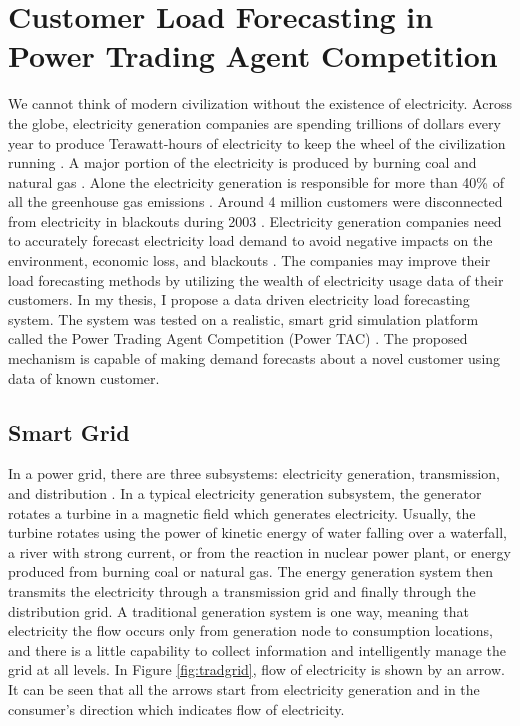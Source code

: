 
\chapter{Customer Load Forecasting in Power Trading Agent Competition}

We cannot think of modern civilization without the existence of electricity. Across the globe, electricity generation companies are spending trillions of dollars every year to produce Terawatt-hours of electricity to keep the wheel of the civilization running \cite{electricityStats}. A major portion of the electricity is produced by burning coal and natural gas \cite{electricityStats}. Alone the electricity generation is responsible for more than 40\% of all the greenhouse gas emissions \cite{schreiber2009environmental}. Around 4 million customers were disconnected from electricity in blackouts during 2003 \cite{andersson2005causes}. Electricity generation companies need to accurately forecast electricity load demand to avoid negative impacts on the environment, economic loss, and blackouts \cite{lodhi2013impact, sanghvi1982economic}. The companies may improve their load forecasting methods by utilizing the wealth of electricity usage data of their customers. In my thesis, I propose a data driven electricity load forecasting system. The system was tested on a realistic, smart grid \cite{fang2012smart} simulation platform called the Power Trading Agent Competition (Power TAC) \cite{ketter2013power}. The proposed mechanism is capable of making demand forecasts about a novel customer using data of known customer.

\section{Smart Grid}

In a power grid, there are three subsystems: electricity generation, transmission, and distribution \cite{fang2012smart}. In a typical electricity generation subsystem, the generator rotates a turbine in a magnetic field which generates electricity. Usually, the turbine rotates using the power of kinetic energy of water falling over a waterfall, a river with strong current, or from the reaction in nuclear power plant, or energy produced from burning coal or natural gas. The energy generation system then transmits the electricity through a transmission grid and finally through the distribution grid. A traditional generation system is one way, meaning that electricity the flow occurs only from generation node to consumption locations, and there is a little capability to collect information and intelligently manage the grid at all levels. In Figure \ref{fig:tradgrid}, flow of electricity is shown by an arrow. It can be seen that all the arrows start from electricity generation and in the consumer's direction which indicates flow of electricity.

